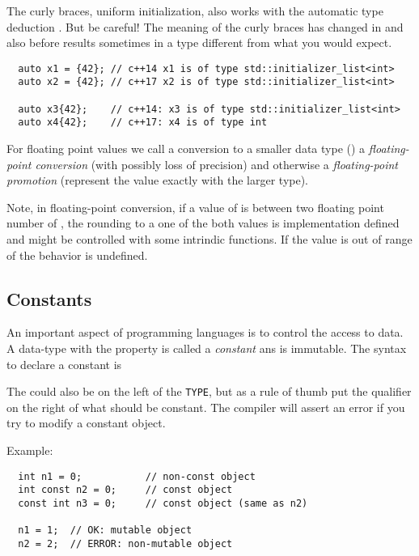 \begin{rem}
  The\marginpar{[\cxx{17}]} curly braces, \ie uniform initialization, also works with the automatic type deduction . But be careful! The meaning
  of the curly braces has changed in  and also before results sometimes in a type different from what you would expect.
  \begin{verbatim}
  auto x1 = {42}; // c++14 x1 is of type std::initializer_list<int>
  auto x2 = {42}; // c++17 x2 is of type std::initializer_list<int>

  auto x3{42};    // c++14: x3 is of type std::initializer_list<int>
  auto x4{42};    // c++17: x4 is of type int
  \end{verbatim}
\end{rem}

\begin{defn}
  For floating point values we call a conversion to a smaller data type (\eg {}) a \emph{floating-point conversion} (with possibly loss of precision) and otherwise a \emph{floating-point promotion} (represent the value exactly with the larger type).
\end{defn}

\begin{rem}
  Note, in floating-point conversion, if a value of  is between two floating point number of , the rounding to a one of the both values is implementation defined and might be controlled with some intrindic functions. If the value is out of range of  the behavior is undefined.
\end{rem}

\subsection{Constants\label{sec:const}}
An important aspect of programming languages is to control the access to data. A data-type with the property 
is called a \emph{constant} ans is immutable. The syntax to declare a constant is


The  could also be on the left of the \texttt{TYPE}, but as a rule of thumb put the qualifier  on the right of what
should be constant. The compiler will assert an error if you try to modify a constant object.

Example:
\begin{verbatim}
  int n1 = 0;           // non-const object
  int const n2 = 0;     // const object
  const int n3 = 0;     // const object (same as n2)

  n1 = 1;  // OK: mutable object
  n2 = 2;  // ERROR: non-mutable object
\end{verbatim}


